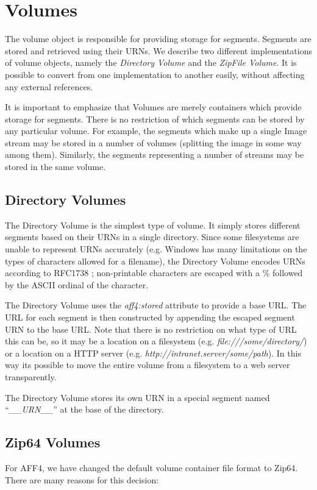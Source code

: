 \documentclass[10pt, conference]{IEEEtran}
\begin{document}
\section{Volumes}
The volume object is responsible for providing storage for
segments. Segments are stored and retrieved using their URNs. We
describe two different implementations of volume objects, namely the
{\em Directory Volume} and the {\em ZipFile Volume}. It is possible to
convert from one implementation to another easily, without affecting
any external references.

It is important to emphasize that Volumes are merely containers which
provide storage for segments. There is no restriction of which
segments can be stored by any particular volume. For example, the
segments which make up a single Image stream may be stored in a number
of volumes (splitting the image in some way among them). Similarly,
the segments representing a number of streams may be stored in the
same volume.

\subsection{Directory Volumes}
The Directory Volume is the simplest type of volume. It simply stores
different segments based on their URNs in a single directory. Since
some filesystems are unable to represent URNs accurately (e.g. Windows
has many limitations on the types of characters allowed for a
filename), the Directory Volume encodes URNs according to RFC1738
\cite{RFC1738}; non-printable characters are escaped with a \%
followed by the ASCII ordinal of the character.

The Directory Volume uses the {\em aff4:stored} attribute to provide a
base URL. The URL for each segment is then constructed by appending
the escaped segment URN to the base URL. Note that there is no
restriction on what type of URL this can be, so it may be a location
on a filesystem (e.g. {\em file:///some/directory/}) or a location on a
HTTP server (e.g. {\em http://intranet.server/some/path}). In this
way its possible to move the entire volume from a filesystem to a web
server transparently.

The Directory Volume stores its own URN in a special segment named
``{\em \_\_URN\_\_}'' at the base of the directory.

\subsection{Zip64 Volumes}
For AFF4, we have changed the default volume container file format to
Zip64\cite{zip-format}. There are many reasons for this decision:
\end{document}
